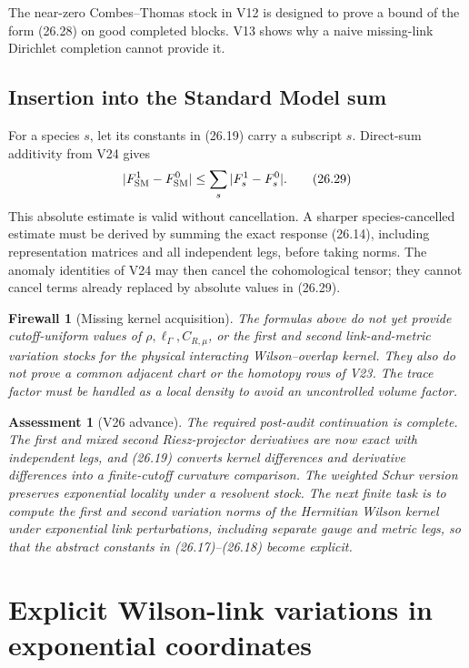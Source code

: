 \documentclass[11pt]{article}
\newtheorem{assessment}[theorem]{Assessment}
\newtheorem{firewall}[theorem]{Firewall}
\begin{document}
The near-zero Combes--Thomas stock in V12 is designed to prove a bound
of the form (26.28) on good completed blocks.  V13 shows why a naive
missing-link Dirichlet completion cannot provide it.

\subsection{Insertion into the Standard Model sum}

For a species \(s\), let its constants in (26.19) carry a subscript
\(s\).  Direct-sum additivity from V24 gives
\[
 |F_{\rm SM}^1-F_{\rm SM}^0|
 \leq
 \sum_s |F_s^1-F_s^0|.
 \tag{26.29}
\]
This absolute estimate is valid without cancellation.  A sharper
species-cancelled estimate must be derived by summing the exact response
(26.14), including representation matrices and all independent legs,
before taking norms.  The anomaly identities of V24 may then cancel the
cohomological tensor; they cannot cancel terms already replaced by
absolute values in (26.29).

\begin{firewall}[Missing kernel acquisition]
\label{fw:v11v26-kernel}
The formulas above do not yet provide cutoff-uniform values of
\(\rho,\ell_\Gamma,C_{R,\mu}\), or the first and second link-and-metric
variation stocks for the physical interacting Wilson--overlap kernel.
They also do not prove a common adjacent chart or the homotopy rows of
V23.  The trace factor must be handled as a local density to avoid an
uncontrolled volume factor.
\end{firewall}

\begin{assessment}[V26 advance]
\label{ass:v11v26}
The required post-audit continuation is complete.  The first and mixed
second Riesz-projector derivatives are now exact with independent legs,
and (26.19) converts kernel differences and derivative differences into
a finite-cutoff curvature comparison.  The weighted Schur version
preserves exponential locality under a resolvent stock.  The next finite
task is to compute the first and second variation norms of the
Hermitian Wilson kernel under exponential link perturbations, including
separate gauge and metric legs, so that the abstract constants in
(26.17)--(26.18) become explicit.
\end{assessment}
\section{Explicit Wilson-link variations in exponential coordinates}
\label{sec:v11v27}
\end{document}
